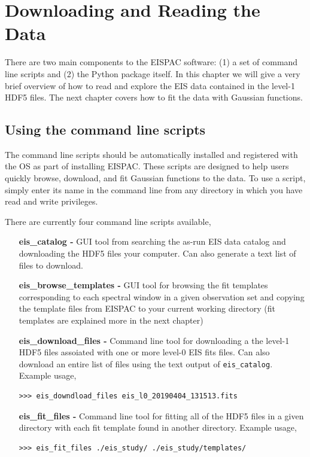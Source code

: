 
\chapter{Downloading and Reading the Data}
\label{sec:download}
There are two main components to the EISPAC software: (1) a set of command line scripts and (2) the
Python package itself. In this chapter we will give a very brief overview of how to read and explore
the EIS data contained in the level-1 HDF5 files. The next chapter covers how to fit the data with Gaussian functions.

\section{Using the command line scripts}
The command line scripts should be automatically installed and registered with the OS as part of
installing EISPAC. These scripts are designed to help users quickly browse, download, and fit Gaussian functions to the data. To use a script, simply enter its name in the command line from any directory in which you have read and write privileges. 

There are currently four command line scripts available,

\begin{itemize}
\item[\bf eis\_catalog -] GUI tool from searching the as-run EIS data catalog and downloading the HDF5 files your computer. Can also generate a text list of files to download.

\item[\bf eis\_browse\_templates -] GUI tool for browsing the fit templates corresponding to each spectral window in a given observation set and copying the template files from EISPAC to your current working directory (fit templates are explained more in the next chapter)

\item[\bf eis\_download\_files -] Command line tool for downloading a the level-1 HDF5 files assoiated with one or more level-0 EIS fits files. Can also download an entire list of files using the text output of \verb+eis_catalog+. Example usage,
\begin{lstlisting}
>>> eis_downdload_files eis_l0_20190404_131513.fits
\end{lstlisting}

\item[\bf eis\_fit\_files -] Command line tool for fitting all of the HDF5 files in a given directory with each fit template found in another directory. Example usage,
\begin{lstlisting}
>>> eis_fit_files ./eis_study/ ./eis_study/templates/
\end{lstlisting}
\end{itemize}

